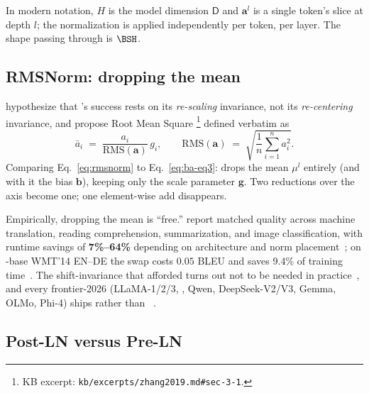 In modern  notation, $H$ is the model dimension $\mathsf{D}$
and $\mathbf{a}^l$ is a single token's  slice at depth
$l$; the normalization is applied independently per token, per layer.
The shape passing through is $\BSH$.

\subsection{RMSNorm: dropping the mean}
\label{sec:norm-rmsnorm}

\citet{zhang2019} hypothesize that 's success rests on its
\emph{re-scaling} invariance, not its \emph{re-centering} invariance,
and propose Root Mean Square %
\footnote{KB excerpt: \nolinkurl{kb/excerpts/zhang2019.md#sec-3-1}.}
defined verbatim as
\begin{equation}
  \bar{a}_i \;=\; \frac{a_i}{\mathrm{RMS}(\mathbf{a})}\, g_i,
  \qquad
  \mathrm{RMS}(\mathbf{a}) \;=\;
  \sqrt{\frac{1}{n} \sum_{i=1}^{n} a_i^2}.
  \tag{Zhang--Eq.~4}
  \label{eq:rmsnorm}
\end{equation}
Comparing Eq.~\eqref{eq:rmsnorm} to Eq.~\eqref{eq:ba-eq3}:  drops
the mean $\mu^l$ entirely (and with it the bias $\mathbf{b}$), keeping
only the scale parameter $\mathbf{g}$. Two reductions over the 
axis become one; one element-wise add disappears.

Empirically, dropping the mean is ``free.'' \citet{zhang2019} report
matched quality across machine translation, reading comprehension,
summarization, and image classification, with runtime savings of
\textbf{7\%--64\%} depending on architecture and norm
placement~\citep[\S 4]{zhang2019}; on -base WMT'14 EN--DE
the swap costs $0.05$ BLEU and saves 9.4\% of training
time~\citep[\S 4]{zhang2019}. The shift-invariance that 
afforded turns out not to be needed in
practice~\citep[\S 3.2]{zhang2019}, and every frontier-2026 
 (LLaMA-1/2/3, , Qwen, DeepSeek-V2/V3, Gemma, OLMo, Phi-4)
ships  rather than
~\citep{touvron2023,jiang2023,meta-llama3,deepseek-v3,qwen3,olmo2,gemma3}.

\subsection{Post-LN versus Pre-LN}
\label{sec:norm-placement}

